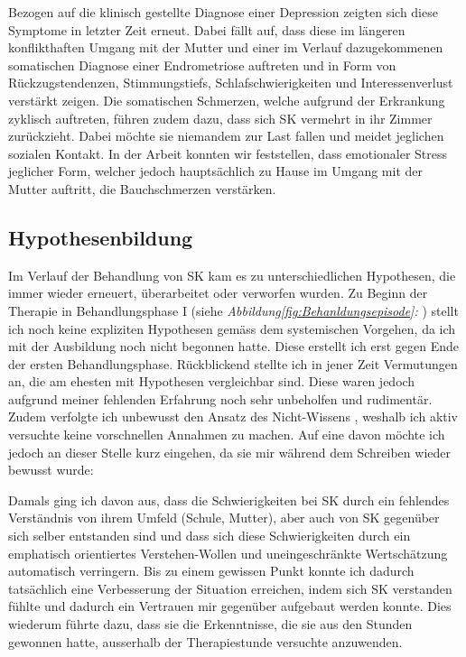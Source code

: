  Bezogen auf die klinisch gestellte Diagnose einer Depression zeigten sich diese Symptome in letzter Zeit erneut. Dabei fällt auf, dass diese im längeren konflikthaften Umgang mit der Mutter und einer im Verlauf dazugekommenen somatischen Diagnose einer Endrometriose auftreten und in  Form von Rückzugstendenzen, Stimmungstiefs, Schlafschwierigkeiten und Interessenverlust verstärkt zeigen. Die somatischen Schmerzen, welche aufgrund der Erkrankung zyklisch auftreten, führen zudem dazu, dass sich SK vermehrt in ihr Zimmer zurückzieht. Dabei möchte sie niemandem zur Last fallen und meidet jeglichen sozialen Kontakt. In der Arbeit konnten wir feststellen, dass emotionaler Stress jeglicher Form, welcher jedoch hauptsächlich zu Hause im Umgang mit der Mutter auftritt, die Bauchschmerzen verstärken.
 
\subsection{Hypothesenbildung} 
Im Verlauf der Behandlung von SK kam es zu unterschiedlichen Hypothesen, die immer wieder erneuert, überarbeitet oder verworfen wurden. Zu Beginn der Therapie in Behandlungsphase I (siehe \textit{Abbildung\ref{fig:Behanldungsepisode}: }) stellt ich noch keine expliziten Hypothesen gemäss dem systemischen Vorgehen, da ich mit der Ausbildung noch nicht begonnen hatte. Diese erstellt ich erst gegen Ende der ersten Behandlungsphase. Rückblickend stellte ich in jener Zeit Vermutungen an, die am ehesten mit Hypothesen vergleichbar sind. Diese waren jedoch aufgrund meiner fehlenden Erfahrung noch sehr unbeholfen und rudimentär. Zudem verfolgte ich unbewusst den Ansatz des Nicht-Wissens \cite{Anderson1992}, weshalb ich aktiv versuchte keine vorschnellen Annahmen zu machen. Auf eine davon möchte ich jedoch an dieser Stelle kurz eingehen, da sie mir während dem Schreiben wieder bewusst wurde: 

Damals ging ich davon aus, dass die Schwierigkeiten bei SK durch ein fehlendes Verständnis von ihrem Umfeld (Schule, Mutter), aber auch  von SK gegenüber sich selber entstanden sind und dass sich diese Schwierigkeiten durch ein emphatisch orientiertes Verstehen-Wollen und uneingeschränkte Wertschätzung automatisch verringern. Bis zu einem gewissen Punkt konnte ich dadurch tatsächlich eine Verbesserung der Situation erreichen, indem sich SK verstanden fühlte und dadurch ein Vertrauen mir gegenüber aufgebaut werden konnte. Dies wiederum führte dazu, dass sie die Erkenntnisse, die sie aus den Stunden gewonnen hatte, ausserhalb der Therapiestunde versuchte anzuwenden.

